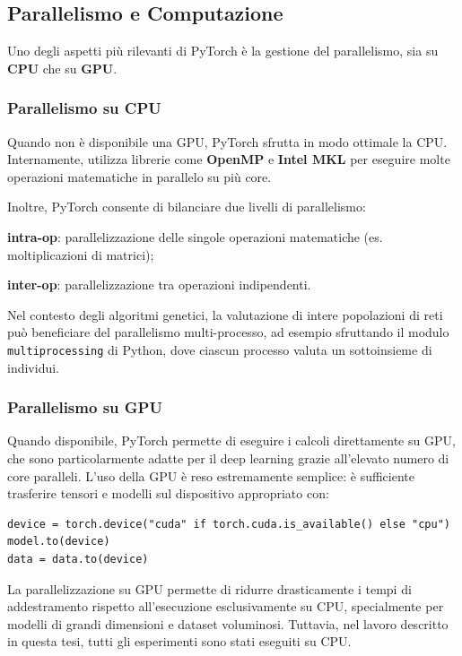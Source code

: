 \subsection{Parallelismo e Computazione}
Uno degli aspetti più rilevanti di PyTorch è la gestione del parallelismo, sia su \textbf{CPU} che su \textbf{GPU}.

\subsubsection{Parallelismo su CPU}
Quando non è disponibile una GPU, PyTorch sfrutta in modo ottimale la CPU. Internamente, utilizza librerie come \textbf{OpenMP} e \textbf{Intel MKL} per eseguire molte operazioni matematiche in parallelo su più core. 

Inoltre, PyTorch consente di bilanciare due livelli di parallelismo:
\begin{compactitemize}
    \item \textbf{intra-op}: parallelizzazione delle singole operazioni matematiche (es. moltiplicazioni di matrici);
    \item \textbf{inter-op}: parallelizzazione tra operazioni indipendenti.
\end{compactitemize}
Nel contesto degli algoritmi genetici, la valutazione di intere popolazioni di reti può beneficiare del parallelismo multi-processo, ad esempio sfruttando il modulo \texttt{multiprocessing} di Python, dove ciascun processo valuta un sottoinsieme di individui.

\subsubsection{Parallelismo su GPU}
Quando disponibile, PyTorch permette di eseguire i calcoli direttamente su GPU, che sono particolarmente adatte per il deep learning grazie all'elevato numero di core paralleli. L'uso della GPU è reso estremamente semplice: è sufficiente trasferire tensori e modelli sul dispositivo appropriato con:
\begin{verbatim}
device = torch.device("cuda" if torch.cuda.is_available() else "cpu")
model.to(device)
data = data.to(device)
\end{verbatim}
La parallelizzazione su GPU permette di ridurre drasticamente i tempi di addestramento rispetto all'esecuzione esclusivamente su CPU, specialmente per modelli di grandi dimensioni e dataset voluminosi. Tuttavia, nel lavoro descritto in questa tesi, tutti gli esperimenti sono stati eseguiti su CPU.

